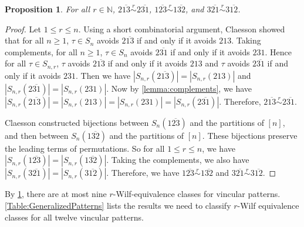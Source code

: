 \documentclass[11pt]{article}
\newtheorem{proposition}[theorem]{Proposition}
\theoremstyle{definition}
\newcommand{\rsim}{\stackrel{r}{\sim}}
\numberwithin{equation}{section}
\begin{document}
\begin{proposition}\label{Proposition:rWilfClassesWithMoreThan1}
For all $r\in\mathbb{N}$, $2\overline{13}\rsim2\overline{31}$, $1\overline{23}\rsim1\overline{32}$, and $3\overline{21}\rsim3\overline{12}$.
\end{proposition}
\begin{proof}
Let $1\leq r\leq n$.
Using a short combinatorial argument, Claesson \cite[Lemma 2]{Claesson2001} showed that for all $n\geq1$, $\tau\in S_n$ avoids $2\overline{13}$ if and only if it avoids $213$. 
Taking complements, for all $n\geq1$, $\tau\in S_n$ avoids $2\overline{31}$ if and only if it avoids $231$. Hence for all $\tau\in S_{n,r}$, $\tau$ avoids $2\overline{13}$ if and only if it avoids $213$ and $\tau$ avoids $2\overline{31}$ if and only if it avoids $231$. Then we have $|S_{n,r}(2\overline{13})|=|S_{n,r}(213)|$ and $|S_{n,r}(2\overline{31})|=|S_{n,r}(231)|$. Now by \cref{lemma:complements}, we have $|S_{n,r}(2\overline{13})|=|S_{n,r}(213)|=|S_{n,r}(231)|=|S_{n,r}(2\overline{31})|$. Therefore, $2\overline{13}\rsim2\overline{31}$.

Claesson \cite[Propositions 2 and 4]{Claesson2001} constructed bijections between $S_n(1\overline{23})$ and the partitions of $[n]$, and then between $S_n(1\overline{32})$ and the partitions of $[n]$. These bijections preserve 
the leading terms of permutations. So for all $1\leq r\leq n$, we have $|S_{n,r}(1\overline{23})|=|S_{n,r}(1\overline{32})|$. Taking the complements, we also have $|S_{n,r}(3\overline{21})|=|S_{n,r}(3\overline{12})|$. Therefore, we have $1\overline{23}\rsim1\overline{32}$ and $3\overline{21}\rsim3\overline{12}$.
\end{proof}


By \cref{Proposition:rWilfClassesWithMoreThan1}, there are at most nine $r$-Wilf-equivalence classes for vincular patterns. \cref{Table:GeneralizedPatterns} lists the results we need to classify $r$-Wilf equivalence classes for all twelve vincular patterns. 
\end{document}
